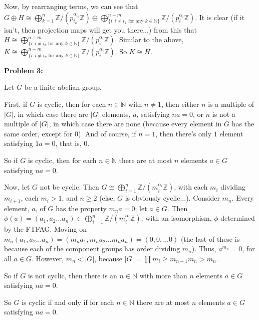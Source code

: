 \documentclass[a4paper,12pt]{article}
\newcommand{\shunt}{\vspace{20mm}}
\newcommand{\absval}[1]{\lvert #1 \rvert}
\newcommand{\al}{\alpha} %
\newcommand{\N}{\mathbb{N}}
\newcommand{\Z}{\mathbb{Z}}
\begin{document}
Now, by rearranging terms, we can see that $G \oplus H \cong \bigoplus\limits_{k=1}^n \Z/(p_{i_k}^{\al_{i_k}}\Z) \oplus \bigoplus\limits_{\{i: i \neq i_k \text{ for any } k \in \N\}}^{n-m} \Z/(p_i^{\al_i}\Z)$. It is clear (if it isn't, then projection maps will get you there...) from this that $H \cong \bigoplus\limits_{\{i: i \neq i_k \text{ for any } k \in \N\}}^{n-m} \Z/(p_i^{\al_i}\Z)$. Similar to the above, $K \cong \bigoplus\limits_{\{i: i \neq i_k \text{ for any } k \in \N\}}^{n-m} \Z/(p_i^{\al_i}\Z)$. So $K \cong H$. 

\shunt

{\bf Problem 3:}

Let $G$ be a finite abelian group.

First, if $G$ is cyclic, then for each $n \in \N$ with $n \neq 1$, then either $n$ is a multiple of $\absval{G}$, in which case there are $\absval{G}$ elements, $a$, satisfying $na = 0$, or $n$ is not a multiple of $\absval{G}$, in which case there are none (because every element in $G$ has the same order, except for $0$). And of course, if $n = 1$, then there's only $1$ element satisfying $1a=0$, that is, $0$.

So if $G$ is cyclic, then for each $n \in \N$ there are at most $n$ elements $a \in G$ satisfying $na =0$.

Now, let $G$ not be cyclic. Then $G \cong \bigoplus\limits_{i=1}^n \Z/(m_i^{\al_i}\Z)$, with each $m_i$ dividing $m_{i+1}$, each $m_i >1$, and $n \geq 2$ (else, $G$ is obviously cyclic...). Consider $m_n$. Every element, $a$, of $G$ has the property $m_na=0$; let $a \in G$. Then $\phi(a)= (a_1,a_2 \ldots a_n) \in \bigoplus\limits_{i=1}^n \Z/(m_i^{\al_i}\Z)$, with an isomorphism, $\phi$ determined by the FTFAG. Moving on $m_n(a_1,a_2 \ldots a_n)=(m_na_1,m_na_2 \ldots m_na_n)=(0,0,\ldots 0)$ (the last of these is because each of the component groups has order dividing $m_n$). Thus, $a^{m_n} = 0$, for all $a \in G$. However, $m_n < \absval{G}$, because $\absval{G} = \prod m_i \geq m_{n-1}m_n > m_n$.

So if $G$ is not cyclic, then there is an $n \in \N$ with more than $n$ elements $a \in G$ satisfying $na=0$.

So $G$ is cyclic if and only if for each $n \in \N$ there are at most $n$ elements $a \in G$ satisfying $na =0$.

\shunt
\end{document}

